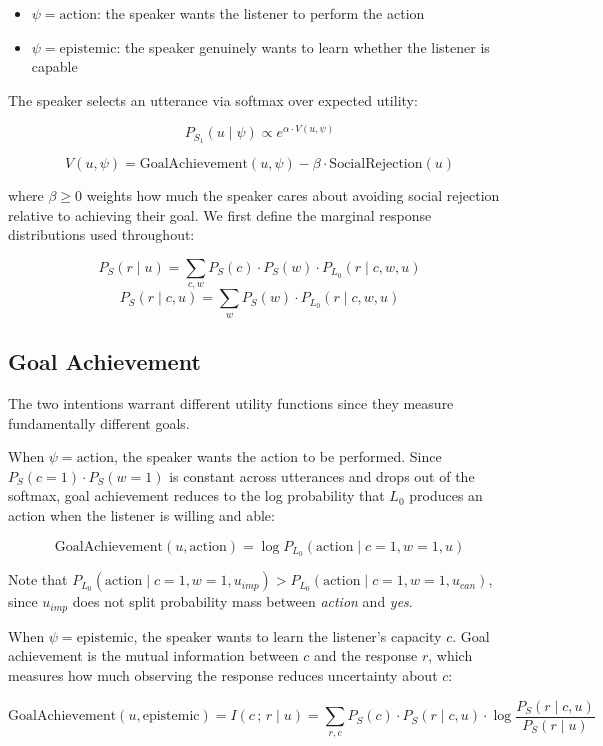 \documentclass[12pt]{article}
\begin{document}
\begin{itemize}
    \item $\psi = \text{action}$: the speaker wants the listener to
        perform the action
    \item $\psi = \text{epistemic}$: the speaker genuinely wants to
        learn whether the listener is capable
\end{itemize}

The speaker selects an utterance via softmax over expected utility:

\[
P_{S_1}(u \mid \psi) \propto e^{\alpha \cdot V(u, \psi)}
\]

\[
V(u, \psi) = \text{GoalAchievement}(u, \psi)
- \beta \cdot \text{SocialRejection}(u)
\]

where $\beta \geq 0$ weights how much the speaker cares about avoiding
social rejection relative to achieving their goal. We first define the
marginal response distributions used throughout:

\[
P_S(r \mid u) = \sum_{c,w} P_S(c) \cdot P_S(w)
\cdot P_{L_0}(r \mid c, w, u)
\]
\[
P_S(r \mid c, u) = \sum_w P_S(w) \cdot P_{L_0}(r \mid c, w, u)
\]

\subsection{Goal Achievement}

The two intentions warrant different utility functions since they
measure fundamentally different goals.

When $\psi = \text{action}$, the speaker wants the action to be
performed. Since $P_S(c=1) \cdot P_S(w=1)$ is constant across
utterances and drops out of the softmax, goal achievement reduces to
the log probability that $L_0$ produces an action when the listener is
willing and able:

\[
\text{GoalAchievement}(u, \text{action})
= \log P_{L_0}(\text{action} \mid c=1, w=1, u)
\]

Note that $P_{L_0}(\text{action} \mid c=1, w=1,
u_{imp}) > P_{L_0}(\text{action} \mid c=1, w=1, u_{can})$, since
$u_{imp}$ does not split probability mass between \textit{action} and
\textit{yes}.

When $\psi = \text{epistemic}$, the speaker wants to learn the
listener's capacity $c$. Goal achievement is the mutual information
between $c$ and the response $r$, which measures how much observing
the response reduces uncertainty about $c$:

\[
\text{GoalAchievement}(u, \text{epistemic})
= I(c\,;\,r \mid u)
= \sum_{r,c} P_S(c) \cdot P_S(r \mid c, u)
  \cdot \log \frac{P_S(r \mid c, u)}{P_S(r \mid u)}
\]
\end{document}
